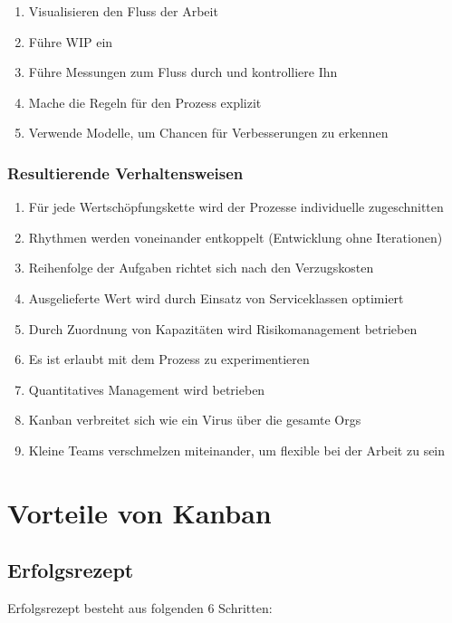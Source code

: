 
\begin{enumerate}
  \item Visualisieren den Fluss der Arbeit
  \item Führe WIP ein
  \item Führe Messungen zum Fluss durch und kontrolliere Ihn
  \item Mache die Regeln für den Prozess explizit
  \item Verwende Modelle, um Chancen für Verbesserungen zu erkennen
\end{enumerate}


\subsubsection{Resultierende Verhaltensweisen}
\begin{enumerate}
  \item Für jede Wertschöpfungskette wird der Prozesse individuelle zugeschnitten
  \item Rhythmen werden voneinander entkoppelt (Entwicklung ohne Iterationen)
  \item Reihenfolge der Aufgaben richtet sich nach den Verzugskosten
  \item Ausgelieferte Wert wird durch Einsatz von Serviceklassen optimiert
  \item Durch Zuordnung von Kapazitäten wird Risikomanagement betrieben
  \item Es ist erlaubt mit dem Prozess zu experimentieren
  \item Quantitatives Management wird betrieben
  \item Kanban verbreitet sich wie ein Virus über die gesamte Orgs
  \item Kleine Teams verschmelzen miteinander, um flexible bei der Arbeit zu sein
\end{enumerate}


\section{Vorteile von Kanban}

\subsection{Erfolgsrezept}
Erfolgsrezept besteht aus folgenden 6 Schritten:

